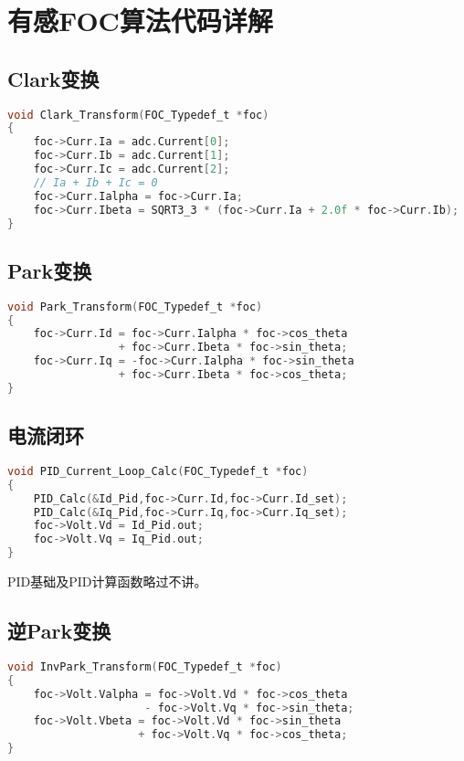 \documentclass[main.tex]{subfiles}
\begin{document}
\section{有感FOC算法代码详解}
\subsection{Clark变换}
\begin{lstlisting}[language=C]
void Clark_Transform(FOC_Typedef_t *foc)
{
    foc->Curr.Ia = adc.Current[0];
    foc->Curr.Ib = adc.Current[1];
    foc->Curr.Ic = adc.Current[2];
    // Ia + Ib + Ic = 0
    foc->Curr.Ialpha = foc->Curr.Ia;
    foc->Curr.Ibeta = SQRT3_3 * (foc->Curr.Ia + 2.0f * foc->Curr.Ib);
}
\end{lstlisting}

\subsection{Park变换}
\begin{lstlisting}[language=C]
void Park_Transform(FOC_Typedef_t *foc)
{
    foc->Curr.Id = foc->Curr.Ialpha * foc->cos_theta 
                 + foc->Curr.Ibeta * foc->sin_theta;
    foc->Curr.Iq = -foc->Curr.Ialpha * foc->sin_theta 
                 + foc->Curr.Ibeta * foc->cos_theta;
}
\end{lstlisting}
\subsection{电流闭环}
\begin{lstlisting}[language=C]
void PID_Current_Loop_Calc(FOC_Typedef_t *foc)
{
	PID_Calc(&Id_Pid,foc->Curr.Id,foc->Curr.Id_set);
	PID_Calc(&Iq_Pid,foc->Curr.Iq,foc->Curr.Iq_set);
	foc->Volt.Vd = Id_Pid.out;
	foc->Volt.Vq = Iq_Pid.out;
}
\end{lstlisting}
PID基础及PID计算函数略过不讲。

\subsection{逆Park变换}
\begin{lstlisting}[language=C]
void InvPark_Transform(FOC_Typedef_t *foc)
{
    foc->Volt.Valpha = foc->Volt.Vd * foc->cos_theta 
                     - foc->Volt.Vq * foc->sin_theta;
    foc->Volt.Vbeta = foc->Volt.Vd * foc->sin_theta 
                    + foc->Volt.Vq * foc->cos_theta;
}
\end{lstlisting}
\end{document}
